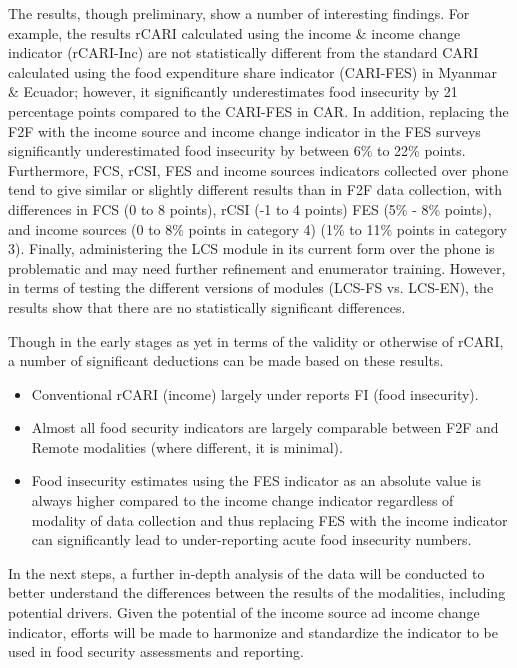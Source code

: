 \documentclass[11pt,harvard]{article}
\begin{document}
The results, though preliminary, show a number of interesting findings. For example, the results rCARI calculated using the income \& income change indicator (rCARI-Inc) are not statistically different from the standard CARI calculated using the food expenditure share indicator (CARI-FES) in Myanmar \& Ecuador; however, it significantly underestimates food insecurity by 21 percentage points compared to the CARI-FES in CAR. In addition, replacing the F2F with the income source and income change indicator in the FES surveys significantly underestimated food insecurity by between 6\% to 22\% points. Furthermore, FCS, rCSI, FES and income sources indicators collected over phone tend to give similar or slightly different results than in F2F data collection, with differences in FCS (0 to 8 points), rCSI (-1 to 4 points) FES (5\% - 8\% points), and income sources (0 to 8\% points in category 4) (1\% to 11\% points in category 3). Finally, administering the LCS module in its current form over the phone is problematic and may need further refinement and enumerator training. However, in terms of testing the different versions of modules (LCS-FS vs. LCS-EN), the results show that there are no statistically significant differences.
 
Though in the early stages as yet in terms of the validity or otherwise of rCARI, a number of significant deductions can be made based on these results.
\begin{itemize}[label=--, left=1.5em] 
	\item [1.] Conventional rCARI (income) largely under reports FI (food insecurity).  
	\item [2.] Almost all food security indicators are largely comparable between F2F and Remote modalities (where different, it is minimal). 
	\item [3.] Food insecurity estimates using the FES indicator as an absolute value is always higher compared to the income change indicator regardless of modality of data collection and thus replacing FES with the income indicator can significantly lead to under-reporting acute food insecurity numbers.
\end{itemize} 

In the next steps, a further in-depth analysis of the data will be conducted to better understand the differences between the results of the modalities, including potential drivers. Given the potential of the income source ad income change indicator, efforts will be made to harmonize and standardize the indicator to be used in food security assessments and reporting.
\end{document}
